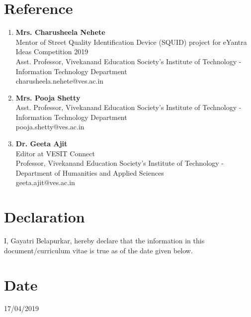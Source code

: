 \documentclass[margin]{res}
\begin{document}
\begin{resume}
\section{Reference}
\begin{enumerate}
  \item {\bf Mrs. Charusheela Nehete}\\Mentor of Street Quality Identification Device (SQUID) project for eYantra Ideas Competition 2019\\  Asst. Professor, Vivekanand Education Society's Institute of Technology - Information Technology Department \\ charusheela.nehete@ves.ac.in
  \item {\bf Mrs. Pooja Shetty}\\ Asst. Professor, Vivekanand Education Society's Institute of Technology - Information Technology Department \\ pooja.shetty@ves.ac.in
  \item {\bf Dr. Geeta Ajit} \\ Editor at VESIT Connect \\ Professor, Vivekanand Education Society's Institute of Technology - Department of Humanities and Applied Sciences \\ geeta.ajit@ves.ac.in
\end{enumerate}

\section{Declaration}
I, Gayatri Belapurkar, hereby declare that the information in this document/curriculum vitae is true as of the date given below. 

\section{Date}
17/04/2019

\end{resume}
\end{document}
